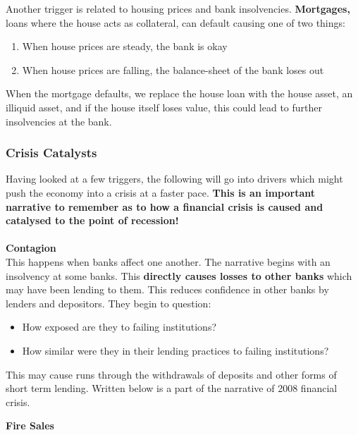 \documentclass[12pt, letterpaper]{article}
\begin{document}
Another trigger is related to housing prices and bank insolvencies. \textbf{Mortgages,} loans where the house acts as collateral, can default causing one of two things:
\begin{enumerate}
	\item When house prices are steady, the bank is okay
	\item When house prices are falling, the balance-sheet of the bank loses out
\end{enumerate}
When the mortgage defaults, we replace the house loan with the house asset, an illiquid asset, and if the house itself loses value, this could lead to further insolvencies at the bank.

\subsubsection{Crisis Catalysts}
Having looked at a few triggers, the following will go into drivers which might push the economy into a crisis at a faster pace. \textbf{This is an important narrative to remember as to how a financial crisis is caused and catalysed to the point of recession!}\\\\
\textbf{Contagion} \\
This happens when banks affect one another. The narrative begins with an insolvency at some banks. This \textbf{directly causes losses to other banks} which may have been lending to them. This reduces confidence in other banks by lenders and depositors. They begin to question:
\begin{itemize}
	\item How exposed are they to failing institutions?
	\item How similar were they in their lending practices to failing institutions?
\end{itemize}
This may cause runs through the withdrawals of deposits and other forms of short term lending. Written below is a part of the narrative of 2008 financial crisis.
\begin{center}
\noindent {}
\end{center}
\textbf{Fire Sales}\\
\end{document}

